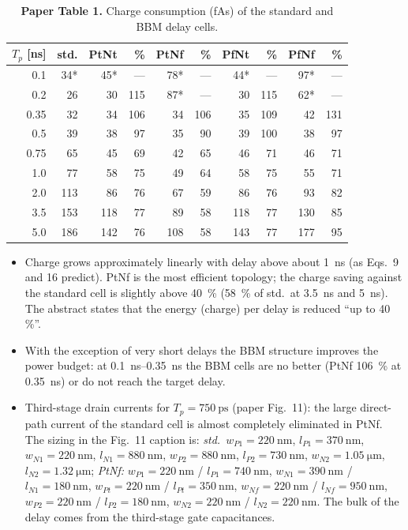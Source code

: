\documentclass[11pt,a4paper]{article}
\begin{document}
\begin{table}[H]
  \centering\small
  \caption*{\textbf{Paper Table 1.} Charge consumption (fAs) of the standard and BBM delay cells.}
  \begin{tabular}{@{}r r r r r r r r r r@{}}
    \toprule
    $T_p$ [ns] & std. & PtNt & \% & PtNf & \% & PfNt & \% & PfNf & \%\\
    \midrule
    0.1  & 34*  & 45*  & --- & 78* & --- & 44* & --- & 97* & ---\\
    0.2  & 26   & 30   & 115 & 87* & --- & 30  & 115 & 62* & ---\\
    0.35 & 32   & 34   & 106 & 34  & 106 & 35  & 109 & 42  & 131\\
    0.5  & 39   & 38   & 97  & 35  & 90  & 39  & 100 & 38  & 97\\
    0.75 & 65   & 45   & 69  & 42  & 65  & 46  & 71  & 46  & 71\\
    1.0  & 77   & 58   & 75  & 49  & 64  & 58  & 75  & 55  & 71\\
    2.0  & 113  & 86   & 76  & 67  & 59  & 86  & 76  & 93  & 82\\
    3.5  & 153  & 118  & 77  & 89  & 58  & 118 & 77  & 130 & 85\\
    5.0  & 186  & 142  & 76  & 108 & 58  & 143 & 77  & 177 & 95\\
    \bottomrule
  \end{tabular}
\end{table}

\begin{itemize}
  \item Charge grows approximately linearly with delay above about \SI{1}{\nano\second} (as Eqs.~9 and 16 predict). PtNf is the most efficient topology; the charge saving against the standard cell is slightly above \SI{40}{\percent} (\SI{58}{\percent} of std.\ at \SI{3.5}{\nano\second} and \SI{5}{\nano\second}). The abstract states that the energy (charge) per delay is reduced ``up to 40\,\%''.
  \item With the exception of very short delays the BBM structure improves the power budget: at \SIrange{0.1}{0.35}{\nano\second} the BBM cells are no better (PtNf \SI{106}{\percent} at \SI{0.35}{\nano\second}) or do not reach the target delay.
  \item Third-stage drain currents for $T_p=\SI{750}{\pico\second}$ (paper Fig.~11): the large direct-path current of the standard cell is almost completely eliminated in PtNf. The sizing in the Fig.~11 caption is: \emph{std.}\ $w_{P1}=\SI{220}{\nano\meter}$, $l_{P1}=\SI{370}{\nano\meter}$, $w_{N1}=\SI{220}{\nano\meter}$, $l_{N1}=\SI{880}{\nano\meter}$, $w_{P2}=\SI{880}{\nano\meter}$, $l_{P2}=\SI{730}{\nano\meter}$, $w_{N2}=\SI{1.05}{\micro\meter}$, $l_{N2}=\SI{1.32}{\micro\meter}$; \emph{PtNf:} $w_{P1}=\SI{220}{\nano\meter}$ / $l_{P1}=\SI{740}{\nano\meter}$, $w_{N1}=\SI{390}{\nano\meter}$ / $l_{N1}=\SI{180}{\nano\meter}$, $w_{Pt}=\SI{220}{\nano\meter}$ / $l_{Pt}=\SI{350}{\nano\meter}$, $w_{Nf}=\SI{220}{\nano\meter}$ / $l_{Nf}=\SI{950}{\nano\meter}$, $w_{P2}=\SI{220}{\nano\meter}$ / $l_{P2}=\SI{180}{\nano\meter}$, $w_{N2}=\SI{220}{\nano\meter}$ / $l_{N2}=\SI{220}{\nano\meter}$. The bulk of the delay comes from the third-stage gate capacitances.
\end{itemize}
\end{document}

